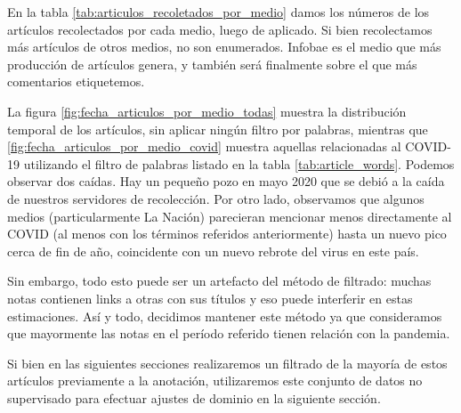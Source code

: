 En la tabla \ref{tab:articulos_recoletados_por_medio} damos los números de los artículos recolectados por cada medio, luego de aplicado. Si bien recolectamos más artículos de otros medios, no son enumerados. Infobae es el medio que más producción de artículos genera, y también será finalmente sobre el que más comentarios etiquetemos.

La figura \ref{fig:fecha_articulos_por_medio_todas} muestra la distribución temporal de los artículos, sin aplicar ningún filtro por palabras, mientras que \ref{fig:fecha_articulos_por_medio_covid} muestra aquellas relacionadas al COVID-19 utilizando el filtro de palabras listado en la tabla \ref{tab:article_words}. Podemos observar dos caídas. Hay un pequeño pozo en mayo 2020 que se debió a la caída de nuestros servidores de recolección. Por otro lado, observamos que algunos medios (particularmente La Nación) parecieran mencionar menos directamente al COVID (al menos con los términos referidos anteriormente) hasta un nuevo pico cerca de fin de año, coincidente con un nuevo rebrote del virus en este país.

Sin embargo, todo esto puede ser un artefacto del método de filtrado: muchas notas contienen links a otras con sus títulos y eso puede interferir en estas estimaciones. Así y todo, decidimos mantener este método ya que consideramos que mayormente las notas en el período referido tienen relación con la pandemia.

Si bien en las siguientes secciones realizaremos un filtrado de la mayoría de estos artículos previamente a la anotación, utilizaremos este conjunto de datos no supervisado para efectuar ajustes de dominio en la siguiente sección.

